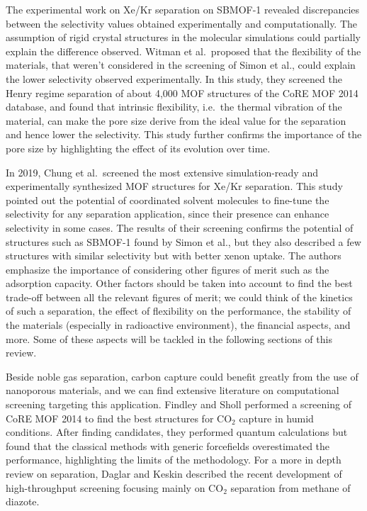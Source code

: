 \documentclass[main.tex]{subfiles}
\begin{document}
The experimental work on Xe/Kr separation on SBMOF-1 revealed discrepancies between the selectivity values obtained experimentally and computationally.\cite{Banerjee_2016} {The assumption of rigid crystal structures in the molecular simulations could partially explain the difference observed.} Witman et al.\ proposed that the flexibility of the materials, that weren't considered in the screening of Simon et al., could explain the lower selectivity observed experimentally.\cite{Witman_2017} In this study, they screened the Henry regime separation of about 4,000 MOF structures of the CoRE MOF 2014 database\cite{Chung_2014}, and found that intrinsic flexibility, i.e.\ the thermal vibration of the material, can make the pore size derive from the ideal value for the separation and hence lower the selectivity. This study further confirms the importance of the pore size by highlighting the effect of its evolution over time.

In 2019, Chung et al.\ screened the most extensive simulation-ready and experimentally synthesized MOF structures for Xe/Kr separation.\cite{Chung_2019} This study pointed out the potential of coordinated solvent molecules to fine-tune the selectivity for any separation application, since their presence can enhance selectivity in some cases. The results of their screening confirms the potential of structures such as SBMOF-1 found by Simon et al., but they also described a few structures with similar selectivity but with better xenon uptake. The authors emphasize the importance of considering other figures of merit such as the adsorption capacity. Other factors should be taken into account to find the best trade-off between all the relevant figures of merit; we could think of the kinetics of such a separation, the effect of flexibility on the performance, the stability of the materials (especially in radioactive environment), the financial aspects, and more. Some of these aspects will be tackled in the following sections of this review.

Beside noble gas separation, carbon capture could benefit greatly from the use of nanoporous materials, and we can find extensive literature on computational screening targeting this application.\cite{Haldoupis_2012,Huck_2014,Li_2016,Darunte_2016,Park_2017,Yang_2020} Findley and Sholl performed a screening of CoRE MOF 2014 to find the best structures for CO$_2$ capture in humid conditions.\cite{Findley_2021} After finding candidates, they performed quantum calculations but found that the classical methods with generic forcefields overestimated the performance, highlighting the limits of the methodology. For a more in depth review on separation, Daglar and Keskin described the recent development of high-throughput screening focusing mainly on CO$_2$ separation from methane of diazote.\cite{Daglar_2020}
\end{document}
